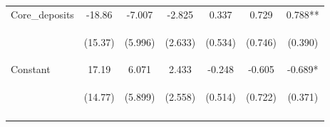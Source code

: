 \documentclass[]{article}
\begin{document}
\begin{center}
\begin{tabular}{lcccccc}
Core\_deposits & -18.86 & -7.007 & -2.825 & 0.337 & 0.729 & 0.788** \\
\vspace{4pt} & \begin{footnotesize}(15.37)\end{footnotesize} & \begin{footnotesize}(5.996)\end{footnotesize} & \begin{footnotesize}(2.633)\end{footnotesize} & \begin{footnotesize}(0.534)\end{footnotesize} & \begin{footnotesize}(0.746)\end{footnotesize} & \begin{footnotesize}(0.390)\end{footnotesize} \\
Constant & 17.19 & 6.071 & 2.433 & -0.248 & -0.605 & -0.689* \\
 & \begin{footnotesize}(14.77)\end{footnotesize} & \begin{footnotesize}(5.899)\end{footnotesize} & \begin{footnotesize}(2.558)\end{footnotesize} & \begin{footnotesize}(0.514)\end{footnotesize} & \begin{footnotesize}(0.722)\end{footnotesize} & \begin{footnotesize}(0.371)\end{footnotesize} \\
\vspace{4pt} & \begin{footnotesize}\end{footnotesize} & \begin{footnotesize}\end{footnotesize} & \begin{footnotesize}\end{footnotesize} & \begin{footnotesize}\end{footnotesize} & \begin{footnotesize}\end{footnotesize} & \begin{footnotesize}\end{footnotesize} \\

\end{tabular}
\end{center}
\end{document}
